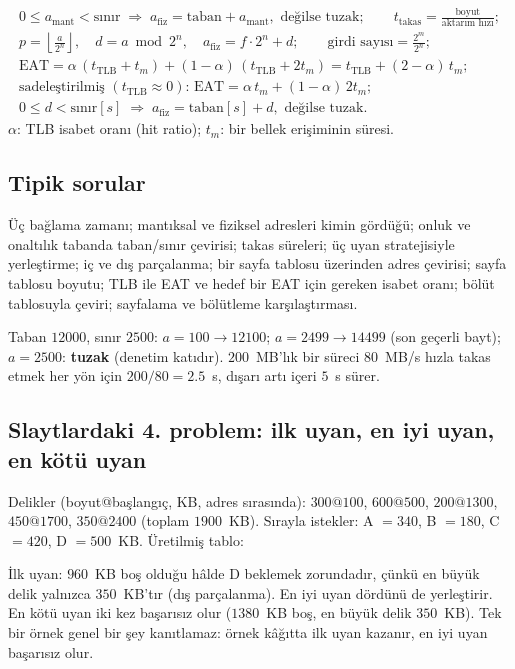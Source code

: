 \begin{keyidea}
\begin{gather*}
0 \le a_{\text{mant}} < \text{sınır} \;\Rightarrow\; a_{\text{fiz}} = \text{taban} + a_{\text{mant}}, \text{ değilse tuzak}; \qquad
t_{\text{takas}} = \frac{\text{boyut}}{\text{aktarım hızı}};\\
p = \left\lfloor \frac{a}{2^{n}} \right\rfloor, \quad d = a \bmod 2^{n}, \quad a_{\text{fiz}} = f\cdot 2^{n} + d; \qquad
\text{girdi sayısı} = \frac{2^{m}}{2^{n}};\\
\text{EAT} = \alpha\,(t_{\text{TLB}} + t_{m}) + (1-\alpha)\,(t_{\text{TLB}} + 2t_{m}) = t_{\text{TLB}} + (2-\alpha)\,t_{m};\\
\text{sadeleştirilmiş } (t_{\text{TLB}}\approx 0)\text{: } \text{EAT} = \alpha\,t_m + (1-\alpha)\,2t_m;\\
0 \le d < \text{sınır}[s] \;\Rightarrow\; a_{\text{fiz}} = \text{taban}[s] + d, \text{ değilse tuzak}.
\end{gather*}
$\alpha$: TLB isabet oranı (hit ratio); $t_m$: bir bellek erişiminin süresi.
\end{keyidea}

\subsection*{Tipik sorular}
Üç bağlama zamanı; mantıksal ve fiziksel adresleri kimin gördüğü; onluk ve onaltılık tabanda taban/sınır çevirisi; takas süreleri; üç uyan stratejisiyle yerleştirme; iç ve dış parçalanma; bir sayfa tablosu üzerinden adres çevirisi; sayfa tablosu boyutu; TLB ile EAT ve hedef bir EAT için gereken isabet oranı; bölüt tablosuyla çeviri; sayfalama ve bölütleme karşılaştırması.

\begin{example}
Taban $12000$, sınır $2500$: $a = 100 \to 12100$; $a = 2499 \to 14499$ (son geçerli bayt); $a = 2500$: \textbf{tuzak} (denetim katıdır). $200$~MB'lık bir süreci $80$~MB/s hızla takas etmek her yön için $200/80 = 2.5$~s, dışarı artı içeri $5$~s sürer.
\end{example}

\subsection{Slaytlardaki 4. problem: ilk uyan, en iyi uyan, en kötü uyan}
Delikler (boyut@başlangıç, KB, adres sırasında): $300@100$, $600@500$, $200@1300$, $450@1700$, $350@2400$ (toplam $1900$~KB). Sırayla istekler: A $= 340$, B $= 180$, C $= 420$, D $= 500$~KB. Üretilmiş tablo:
\begin{center}\small{}\end{center}
İlk uyan: $960$~KB boş olduğu hâlde D beklemek zorundadır, çünkü en büyük delik yalnızca $350$~KB'tır (dış parçalanma). En iyi uyan dördünü de yerleştirir. En kötü uyan iki kez başarısız olur ($1380$~KB boş, en büyük delik $350$~KB). Tek bir örnek genel bir şey kanıtlamaz: örnek kâğıtta ilk uyan kazanır, en iyi uyan başarısız olur.

